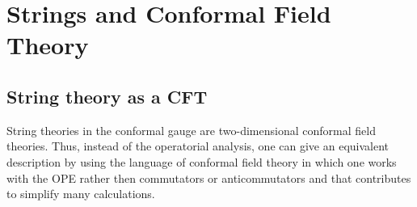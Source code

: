 \chapter{Strings and Conformal Field Theory}
\adjustmtc
\minitoc
\section{String theory as a CFT}
\par String theories in the conformal gauge are two-dimensional
conformal field theories. Thus, instead of the operatorial analysis, one can give an equivalent description
by using the language of conformal field theory in which one works with the
OPE rather then commutators or anticommutators and that contributes to
simplify many calculations. 
